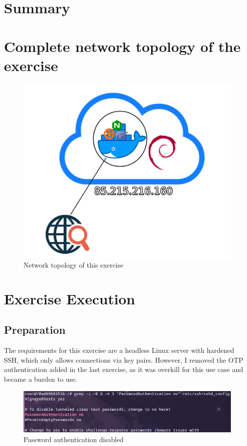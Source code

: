 \documentclass[a4paper]{article}
\begin{document}
\section{Summary}

\newpage

\section{Complete network topology of the exercise}

\begin{figure}[h]
	\includegraphics[scale=0.3]{images/topology.png}
	\centering
	\caption{Network topology of this exercise}
\end{figure}

\newpage

\section{Exercise Execution}

\subsection{Preparation}
The requirements for this exercise are a headless Linux server with hardened SSH, which only allows connections via key pairs. However, I removed the OTP authentication added in the last exercise, as it was overkill for this use case and became a burden to use.
\begin{figure}[h]
	\includegraphics[scale=0.26]{images/sshnopw.png}
	\centering
	\caption{Password authentication disabled}
\end{figure} 
\end{document}
